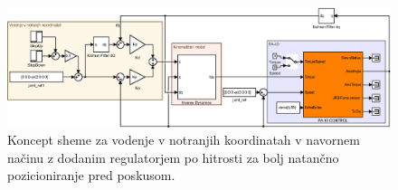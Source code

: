 \begin{figure}
	\centering
	\includegraphics[width=\textwidth]{./Slike/notranje_koordinate_tq.eps}
	\caption{Koncept \simulink sheme za vodenje v notranjih koordinatah v navornem na\v{c}inu z dodanim regulatorjem po hitrosti za bolj natan\v{c}no pozicioniranje pred poskusom.}
	\label{fig:notranje_koordinate_tq}
\end{figure}

